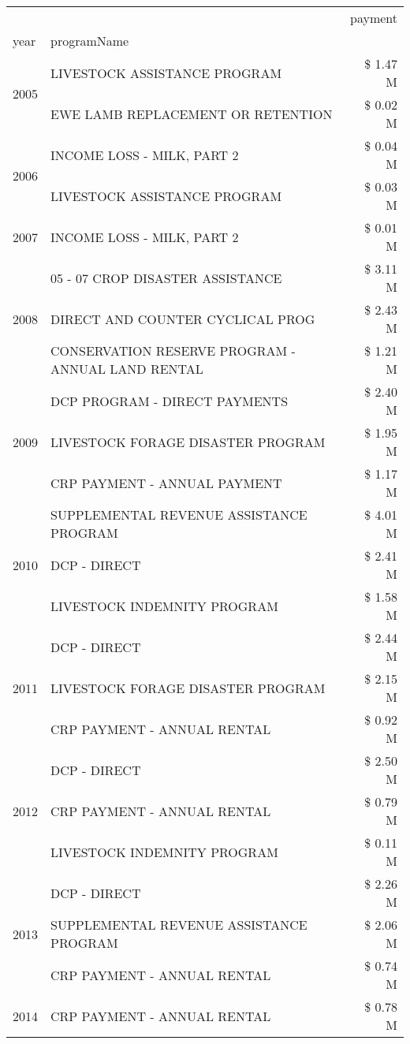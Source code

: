 \begin{tabular}{llr}
\toprule
 &  & payment \\
year & programName &  \\
\midrule
\multirow[t]{2}{*}{2005} & LIVESTOCK ASSISTANCE PROGRAM & \$ 1.47 M \\
 & EWE LAMB REPLACEMENT OR RETENTION & \$ 0.02 M \\
\cline{1-3}
\multirow[t]{2}{*}{2006} & INCOME LOSS - MILK, PART 2 & \$ 0.04 M \\
 & LIVESTOCK ASSISTANCE PROGRAM & \$ 0.03 M \\
\cline{1-3}
2007 & INCOME LOSS - MILK, PART 2 & \$ 0.01 M \\
\cline{1-3}
\multirow[t]{3}{*}{2008} & 05 - 07 CROP DISASTER ASSISTANCE & \$ 3.11 M \\
 & DIRECT AND COUNTER CYCLICAL PROG & \$ 2.43 M \\
 & CONSERVATION RESERVE PROGRAM - ANNUAL LAND RENTAL & \$ 1.21 M \\
\cline{1-3}
\multirow[t]{3}{*}{2009} & DCP PROGRAM - DIRECT PAYMENTS & \$ 2.40 M \\
 & LIVESTOCK FORAGE DISASTER  PROGRAM & \$ 1.95 M \\
 & CRP PAYMENT - ANNUAL PAYMENT & \$ 1.17 M \\
\cline{1-3}
\multirow[t]{3}{*}{2010} & SUPPLEMENTAL REVENUE ASSISTANCE PROGRAM & \$ 4.01 M \\
 & DCP - DIRECT & \$ 2.41 M \\
 & LIVESTOCK INDEMNITY PROGRAM & \$ 1.58 M \\
\cline{1-3}
\multirow[t]{3}{*}{2011} & DCP - DIRECT & \$ 2.44 M \\
 & LIVESTOCK FORAGE DISASTER PROGRAM & \$ 2.15 M \\
 & CRP PAYMENT - ANNUAL RENTAL & \$ 0.92 M \\
\cline{1-3}
\multirow[t]{3}{*}{2012} & DCP - DIRECT & \$ 2.50 M \\
 & CRP PAYMENT - ANNUAL RENTAL & \$ 0.79 M \\
 & LIVESTOCK INDEMNITY PROGRAM & \$ 0.11 M \\
\cline{1-3}
\multirow[t]{3}{*}{2013} & DCP - DIRECT & \$ 2.26 M \\
 & SUPPLEMENTAL REVENUE ASSISTANCE PROGRAM & \$ 2.06 M \\
 & CRP PAYMENT - ANNUAL RENTAL & \$ 0.74 M \\
\cline{1-3}
\multirow[t]{3}{*}{2014} & CRP PAYMENT - ANNUAL RENTAL & \$ 0.78 M \\

\end{tabular}
